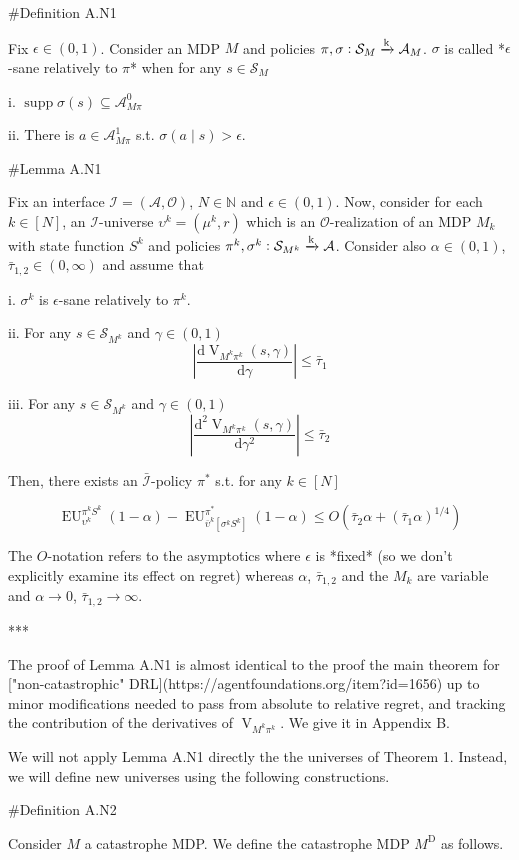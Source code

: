 \documentclass[a4paper]{article}
\DeclareMathOperator{\Supp}{supp}
\newcommand{\AP}[1]{\left(#1\right)}
\newcommand{\AB}[1]{\left[#1\right]}
\newcommand{\D}{\mathrm{d}}
\newcommand{\Nats}{\mathbb{N}}
\newcommand{\Abs}[1]{\left\vert #1 \right\vert}
\newcommand{\M}{\xrightarrow{\textnormal{k}}}
\newcommand{\Ob}{\mathcal{O}}
\newcommand{\A}{\mathcal{A}}
\newcommand{\St}{\mathcal{S}}
\newcommand{\In}{\mathcal{I}}
\newcommand{\Adi}{{\bar{\In}}}
\newcommand{\RMD}{\mathrm{D}}
\newcommand{\MD}{M^{\RMD}}
\newcommand{\V}{\operatorname{V}}
\newcommand{\EU}{\operatorname{EU}}
\begin{document}
\#Definition A.N1

Fix $\epsilon\in(0,1)$. Consider an MDP $M$ and policies $\pi,\sigma: \St_M \M \A_M$. $\sigma$ is called *$\epsilon$-sane relatively to $\pi$* when for any $s \in \St_M$

i. $\Supp{\sigma(s)} \subseteq \A_{M\pi}^0$

ii. There is $a \in \A_{M\pi}^1$ s.t. $\sigma(a \mid s) > \epsilon$.

\#Lemma A.N1

Fix an interface $\In=(\A,\Ob)$, $N \in \Nats$ and $\epsilon \in (0,1)$. Now, consider for each $k \in [N]$, an $\In$-universe $\upsilon^k=(\mu^k,r)$ which is an $\Ob$-realization of an MDP $M_k$ with state function $S^k$ and policies $\pi^k,\sigma^k: \St_{M^k} \M \A$. Consider also $\alpha\in(0,1)$, $\bar{\tau}_{1,2} \in (0,\infty)$ and assume that 

i. $\sigma^k$ is $\epsilon$-sane relatively to $\pi^k$.

ii. For any $s \in \St_{M^k}$ and $\gamma\in(0,1)$ $$\Abs{\frac{\D\V_{M^k\pi^k}(s,\gamma)}{\D\gamma}} \leq \bar{\tau}_1$$

iii. For any $s \in \St_{M^k}$ and $\gamma\in(0,1)$ $$\Abs{\frac{\D^2\V_{M^k\pi^k}(s,\gamma)}{\D\gamma^2}} \leq \bar{\tau}_2$$

Then, there exists an $\Adi$-policy $\pi^*$ s.t. for any $k \in [N]$

$$\EU_{\upsilon^k}^{\pi^k S^k}(1-\alpha) - \EU_{\bar{\upsilon}^k\AB{\sigma^k S^k}}^{\pi^*}(1-\alpha) \leq O\AP{\bar{\tau}_2 \alpha + (\bar{\tau}_1 \alpha)^{1/4}}$$

The $O$-notation refers to the asymptotics where $\epsilon$ is *fixed* (so we don't explicitly examine its effect on regret) whereas $\alpha$, $\bar{\tau}_{1,2}$ and the $M_k$ are variable and $\alpha \rightarrow 0$, $\bar{\tau}_{1,2} \rightarrow \infty$.

***

The proof of Lemma A.N1 is almost identical to the proof the main theorem for ["non-catastrophic" DRL](https://agentfoundations.org/item?id=1656) up to minor modifications needed to pass from absolute to relative regret, and tracking the contribution of the derivatives of $\V_{M^k\pi^k}$. We give it in Appendix B.

We will not apply Lemma A.N1 directly the the universes of Theorem 1. Instead, we will define new universes using the following constructions.

\#Definition A.N2

Consider $M$ a catastrophe MDP. We define the catastrophe MDP $\MD$ as follows.
\end{document}
